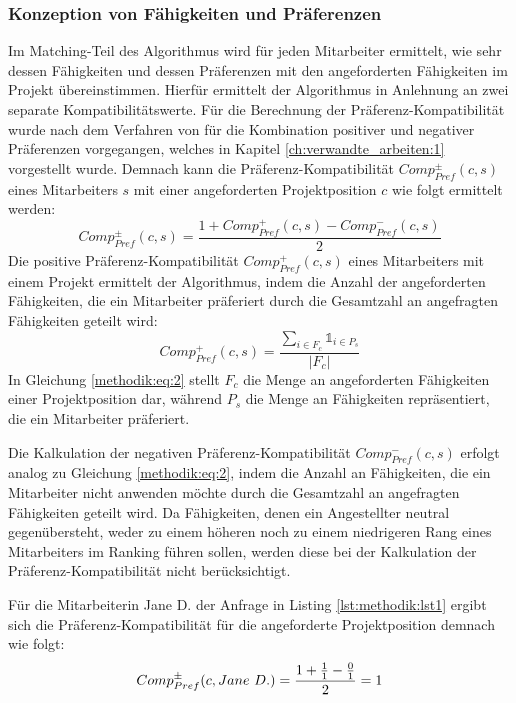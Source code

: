 \subsubsection{Konzeption von Fähigkeiten und Präferenzen}
Im Matching-Teil des Algorithmus wird für jeden Mitarbeiter ermittelt, wie sehr dessen Fähigkeiten und dessen Präferenzen mit den angeforderten Fähigkeiten im Projekt übereinstimmen.
Hierfür ermittelt der Algorithmus in Anlehnung an \textcite[S. 207ff.]{pizzato:2010} zwei separate Kompatibilitätswerte.
Für die Berechnung der Präferenz-Kompatibilität wurde nach dem Verfahren von \textcite[S. 269ff.]{pizzato:2:inproceedings} für die Kombination positiver und negativer Präferenzen vorgegangen, welches in Kapitel \ref{ch:verwandte_arbeiten:1} vorgestellt wurde.
Demnach kann die Präferenz-Kompatibilität $Comp_{Pref}^{\pm}(c,s)$ eines Mitarbeiters $s$ mit einer angeforderten Projektposition $c$ wie folgt ermittelt werden:
\begin{equation}\label{methodik:eq:1}
    Comp_{Pref}^{\pm}(c,s)=\frac{1+Comp_{Pref}^{+}(c,s)-Comp_{Pref}^{-}(c,s)}{2}
\end{equation}
Die positive Präferenz-Kompatibilität $Comp_{Pref}^{+}(c,s)$ eines Mitarbeiters mit einem Projekt ermittelt der Algorithmus, indem die Anzahl der angeforderten Fähigkeiten, die ein Mitarbeiter präferiert durch die Gesamtzahl an angefragten Fähigkeiten geteilt wird:
\begin{equation}\label{methodik:eq:2}
    Comp_{Pref}^{+}(c,s)=\frac{\sum\limits_{i \in F_{c}} \mathbb{1}_{i \in P_{s}}}{|F_{c}|}
\end{equation}
In Gleichung \ref{methodik:eq:2} stellt $F_{c}$ die Menge an angeforderten Fähigkeiten einer Projektposition dar, während $P_{s}$ die Menge an Fähigkeiten repräsentiert, die ein Mitarbeiter präferiert.

Die Kalkulation der negativen Präferenz-Kompatibilität $Comp_{Pref}^{-}(c,s)$ erfolgt analog zu Gleichung \ref{methodik:eq:2}, indem die Anzahl an Fähigkeiten, die ein Mitarbeiter nicht anwenden möchte durch die Gesamtzahl an angefragten Fähigkeiten geteilt wird.
Da Fähigkeiten, denen ein Angestellter neutral gegenübersteht, weder zu einem höheren noch zu einem niedrigeren Rang eines Mitarbeiters im Ranking führen sollen, werden diese bei der Kalkulation der Präferenz-Kompatibilität nicht berücksichtigt.

Für die Mitarbeiterin Jane D. der Anfrage in Listing \ref{lst:methodik:lst1} ergibt sich die Präferenz-Kompatibilität für die angeforderte Projektposition demnach wie folgt:
\begin{equation}\label{methodik:eq:4}
    Comp_{Pref}^{\pm}(c,Jane \textnormal{ }D.) = \frac{1+\frac{1}{1}-\frac{0}{1}}{2} = 1
\end{equation}

